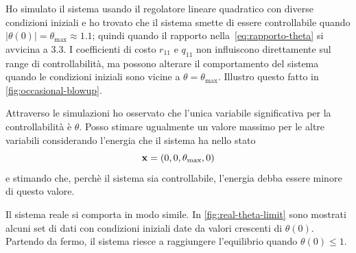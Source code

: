 Ho simulato il sistema usando il regolatore lineare quadratico
con diverse condizioni iniziali e ho trovato che
il sistema smette di essere controllabile quando $|\theta(0)| = \theta_{\max} \approx 1.1$;
quindi quando il rapporto nella~\eqref{eq:rapporto-theta} si avvicina a $3.3$.
I coefficienti di costo $r_{11}$ e $q_{11}$ non influiscono
direttamente sul range di controllabilità, ma possono alterare
il comportamento del sistema quando le condizioni iniziali sono
vicine a $\theta = \theta_{\max}$.
Illustro questo fatto in \autoref{fig:occasional-blowup}.

Attraverso le simulazioni ho osservato che l'unica variabile
significativa per la controllabilità è $\theta$.
Posso stimare ugualmente un valore massimo per le altre
variabili considerando l'energia che il sistema ha nello stato
\begin{equation*}
    \mathbf{x} = (0, 0, \theta_{\max}, 0)
\end{equation*}
e stimando che, perchè il sistema sia controllabile,
l'energia debba essere minore di questo valore.

Il sistema reale si comporta in modo simile.
In \autoref{fig:real-theta-limit} sono mostrati alcuni set di dati
con condizioni iniziali date da valori crescenti di $\theta(0)$.
Partendo da fermo, il sistema riesce a raggiungere l'equilibrio quando
$\theta(0) \leq 1$.

